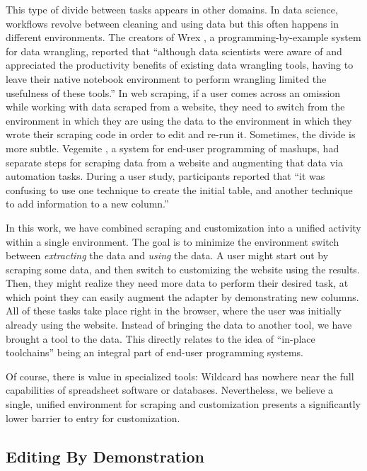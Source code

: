 \documentclass[sigconf,10pt]{acmart}
\begin{document}
This type of divide between tasks appears in other domains. In data
science, workflows revolve between cleaning and using data but this
often happens in different environments. The creators of Wrex
\citep{drosos2020}, a programming-by-example system for data wrangling,
reported that ``although data scientists were aware of and appreciated
the productivity benefits of existing data wrangling tools, having to
leave their native notebook environment to perform wrangling limited the
usefulness of these tools.'' In web scraping, if a user comes across an
omission while working with data scraped from a website, they need to
switch from the environment in which they are using the data to the
environment in which they wrote their scraping code in order to edit and
re-run it. Sometimes, the divide is more subtle. Vegemite
\citep{lin2009}, a system for end-user programming of mashups, had
separate steps for scraping data from a website and augmenting that data
via automation tasks. During a user study, participants reported that
``it was confusing to use one technique to create the initial table, and
another technique to add information to a new column.''

In this work, we have combined scraping and customization into a unified
activity within a single environment. The goal is to minimize the
environment switch between \emph{extracting} the data and \emph{using}
the data. A user might start out by scraping some data, and then switch
to customizing the website using the results. Then, they might realize
they need more data to perform their desired task, at which point they
can easily augment the adapter by demonstrating new columns. All of
these tasks take place right in the browser, where the user was
initially already using the website. Instead of bringing the data to
another tool, we have brought a tool to the data. This directly relates
to the idea of ``in-place toolchains'' \citep{zotero-60} being an
integral part of end-user programming systems.

Of course, there is value in specialized tools: Wildcard has nowhere
near the full capabilities of spreadsheet software or databases.
Nevertheless, we believe a single, unified environment for scraping and
customization presents a significantly lower barrier to entry for
customization.

\hypertarget{editing-by-demonstration-1}{%
\subsection{Editing By Demonstration}\label{editing-by-demonstration-1}}
\end{document}
